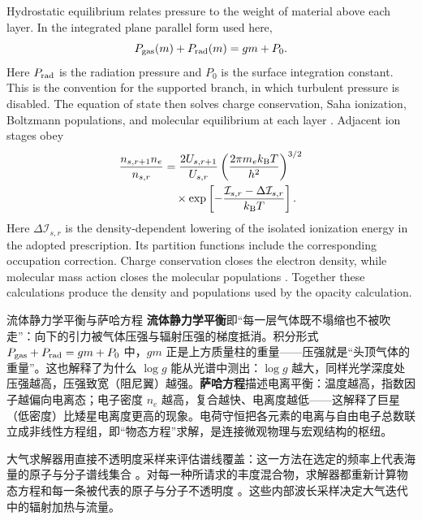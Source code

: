\begin{EN}
Hydrostatic equilibrium relates pressure to the weight of material above each
layer. In the integrated plane parallel form used here,
\begin{equation}
P_{\rm gas}(m)+P_{\rm rad}(m)
=g m+P_0 .
\end{equation}
\noindent Here $P_{\rm rad}$ is the radiation pressure and $P_0$ is the surface
integration constant. This is the convention for the supported
branch, in which turbulent pressure is disabled. The equation of state then solves charge
conservation, Saha ionization, Boltzmann populations, and molecular equilibrium
at each layer \citep{Tsuji1973,Mihalas1978,HubenyMihalas2014}. Adjacent ion stages obey
\begin{equation}
\begin{aligned}
\frac{n_{s,r+1}n_e}{n_{s,r}}
&=\frac{2U_{s,r+1}}{U_{s,r}}
\left(\frac{2\pi m_e k_{\rm B}T}{h^2}\right)^{3/2} \\
&\quad\times
\exp\left[-\frac{\mathcal{I}_{s,r}-\Delta\mathcal{I}_{s,r}}
{k_{\rm B}T}\right].
\end{aligned}
\end{equation}
\noindent Here $\Delta\mathcal{I}_{s,r}$ is the density-dependent lowering of
the isolated ionization energy in the adopted prescription. Its
partition functions include the corresponding occupation correction. Charge
conservation closes the electron density, while
molecular mass action closes the molecular populations
\citep{Tsuji1973,BarklemCollet2016}. Together these
calculations produce the density and populations used by the opacity calculation.
\end{EN}

\begin{physbox}{流体静力学平衡与萨哈方程}
\textbf{流体静力学平衡}即“每一层气体既不塌缩也不被吹走”：向下的引力被气体压强与辐射压强的梯度抵消。积分形式 $P_{\rm gas}+P_{\rm rad}=gm+P_0$ 中，$gm$ 正是上方质量柱的重量——压强就是“头顶气体的重量”。这也解释了为什么 $\log g$ 能从光谱中测出：$\log g$ 越大，同样光学深度处压强越高，压强致宽（阻尼翼）越强。\textbf{萨哈方程}描述电离平衡：温度越高，指数因子越偏向电离态；电子密度 $n_e$ 越高，复合越快、电离度越低——这解释了巨星（低密度）比矮星电离度更高的现象。电荷守恒把各元素的电离与自由电子总数联立成非线性方程组，即“物态方程”求解，是连接微观物理与宏观结构的枢纽。
\end{physbox}

大气求解器用直接不透明度采样来评估谱线覆盖：这一方法在选定的频率上代表海量的原子与分子谱线集合 \citep{JohnsonKrupp1976}。对每一种所请求的丰度混合物，求解器都重新计算物态方程和每一条被代表的原子与分子不透明度 \citep{Kurucz1996,KuruczAtlas12ASCL}。这些内部波长采样决定大气迭代中的辐射加热与流量。


